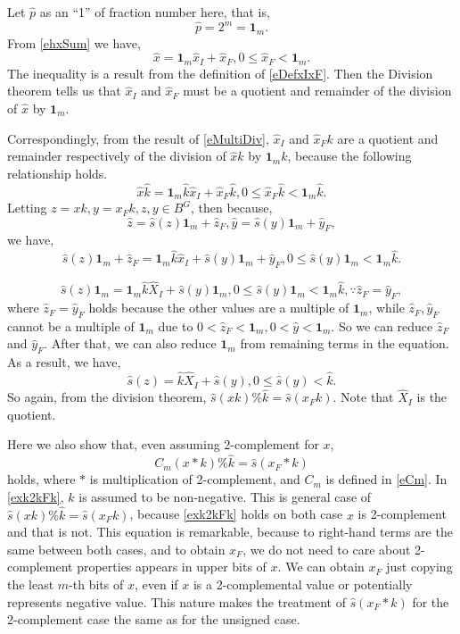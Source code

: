 \documentclass[a4paper]{article}
\newcommand{\eqlabel}[1]{\label{#1}\tag{#1}}
\newcommand{\hx}{{\hat{x}}}
\newcommand{\hp}{{\hat{p}}}
\newcommand{\hy}{{\hat{y}}}
\newcommand{\hz}{{\hat{z}}}
\newcommand{\hk}{{\hat{k}}}
\newcommand{\hs}{{\hat{s}}}
\newcommand{\hX}{{\hat{X}}}
\newcommand{\fum}{{\mathbf{1}_m}}
\begin{document}
Let \(\hp\) as an ``1'' of fraction number here, that is,
\[
    \hp = 2^m = \fum.
\]
From \eqref{ehxSum} we have,
\[
    \hx = \fum \hx_I + \hx_F, 0 \leq \hx_F < \fum.
\]
The inequality is a result from the definition of \eqref{eDefxIxF}. Then the Division theorem tells us that \(\hx_I\) and \(\hx_F\) must be a quotient and remainder of the division of \(\hx\) by \(\fum\).

Correspondingly, from the result of \eqref{eMultiDiv}, \(\hx_I\) and \(\hx_F k\) are a quotient and remainder respectively of the division of \(\hx k\) by \(\fum k\), because the following relationship holds.
\[
    \hx \hk = \fum \hk \hx_I + \hx_F \hk, 0 \leq \hx_F \hk < \fum \hk.
\]
Letting \(z = x k, y = x_F k, z, y \in B^{G}\), then because,
\begin{equation}
    \eqlabel{ezyfum}
    \hz = \hs(z) \fum + \hz_F, \hy  = \hs(y) \fum + \hy_F,
\end{equation}
we have,
\[
    \hs(z) \fum + \hz_F = \fum \hk \hx_I + \hs(y) \fum + \hy_F, 0 \leq \hs(y) \fum < \fum \hk.
\]

\[
    \hs(z) \fum = \fum \hk \hX_I + \hs(y) \fum , 0 \leq \hs(y) \fum < \fum \hk, \because \hz_F = \hy_F,
\]
where \(\hz_F = \hy_F\) holds because the other values are a multiple of \(\fum\), while \(\hz_F, \hy_F\) cannot be a multiple of \(\fum\) due to \(0< \hz_F < \fum, 0< \hy < \fum\). So we can reduce \(\hz_F\) and \(\hy_F\). After that, we can also reduce \(\fum\) from remaining terms in the equation. As a result, we have,
\begin{equation}
    \eqlabel{eUscaleRem}
    \hs(z)  =  \hk \hX_I + \hs(y), 0 \leq \hs(y)  <  \hk.
\end{equation}
So again, from the division theorem, \(\hs(x k)\% \hk = \hs(x_F k)\). Note that \(\hX_I\) is the quotient.

Here we also show that, even assuming 2-complement for \(x\), 
\begin{equation}
    \eqlabel{exk2kFk}
    C_m(x*k) \% \hk = \hs(x_F*k)
\end{equation} 
holds, where \(*\) is multiplication of 2-complement, and \(C_m\) is defined in \eqref{eCm}. In \eqref{exk2kFk}, \(k\) is assumed to be non-negative. This is general case of \(\hs(x k)\% \hk = \hs(x_F k)\), because \eqref{exk2kFk} holds on both case \(x\) is 2-complement and that is not. This equation is remarkable, because to right-hand terms are the same between both cases, and to obtain \(x_F\), we do not need to care about 2-complement properties appears in upper bits of \(x\). We can obtain \(x_F\) just copying the least \(m\)-th bits of \(x\), even if \(x\) is a 2-complemental value or potentially represents negative value. This nature makes the treatment of \(\hs(x_F*k)\) for the 2-complement case the same as for the unsigned case.
\end{document}
